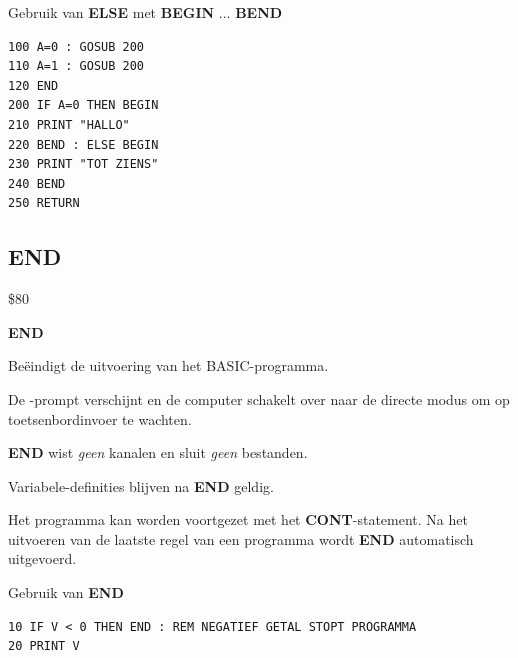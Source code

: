 \begin{description}[leftmargin=2cm,style=nextline]
                  Gebruik van {\bf ELSE} met {\bf BEGIN} ... {\bf BEND}

\begin{tcolorbox}[colback=black,coltext=white]
\verbatimfont{\codefont}
\begin{verbatim}
100 A=0 : GOSUB 200
110 A=1 : GOSUB 200
120 END
200 IF A=0 THEN BEGIN
210 PRINT "HALLO"
220 BEND : ELSE BEGIN
230 PRINT "TOT ZIENS"
240 BEND
250 RETURN
\end{verbatim}
\end{tcolorbox}
\end{description}


\newpage
\subsection{END}
\begin{description}[leftmargin=2cm,style=nextline]
\item [Token:]    \$80

\item [Formaat:]   {\bf END}

\item [Gebruik:]    Beëindigt de uitvoering van het BASIC-programma.

                  De -prompt verschijnt en de computer schakelt over naar de directe modus om op toetsenbordinvoer te wachten.

\item [Opmerkingen:]  {\bf END} wist \emph{geen} kanalen en sluit \emph{geen} bestanden.

                  Variabele-definities blijven na {\bf END} geldig.

                  Het programma kan worden voortgezet met het {\bf CONT}-statement. Na het uitvoeren van de laatste regel van een programma wordt {\bf END} automatisch uitgevoerd.

\item [Voorbeeld:]  Gebruik van {\bf END}

\begin{tcolorbox}[colback=black,coltext=white]
\verbatimfont{\codefont}
\begin{verbatim}
10 IF V < 0 THEN END : REM NEGATIEF GETAL STOPT PROGRAMMA
20 PRINT V
\end{verbatim}
\end{tcolorbox}
\end{description}


